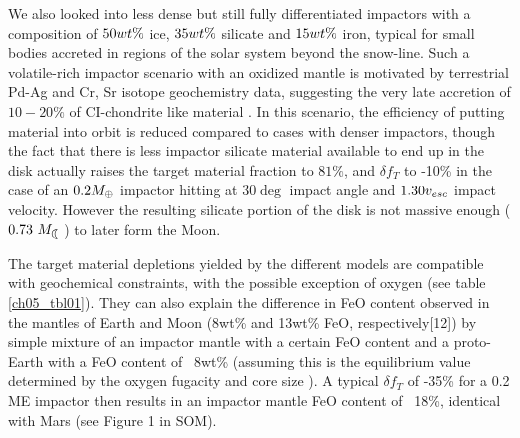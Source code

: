 We also looked into less dense but still fully differentiated impactors with a composition of $50 wt\mathrm{\%}$ ice, $35 wt\mathrm{\%}$ silicate and $15 wt\mathrm{\%}$ iron, typical for small bodies accreted in regions of the solar system beyond the snow-line. Such a volatile-rich impactor scenario with an oxidized mantle is motivated  by terrestrial Pd-Ag and Cr, Sr isotope geochemistry data, suggesting the very late accretion of $10-20\%$ of CI-chondrite like material \citep{2010Sci...328..884S}. In this scenario, the efficiency of putting material into orbit is reduced compared to cases with denser impactors, though the fact that there is less impactor silicate material available to end up in the disk actually raises the target material fraction to $81\%$, and $\delta f_{T}$ to -10\% in the case of an $0.2 M_{\oplus}$ impactor hitting at $30 \deg$ impact angle and $1.30 v_{esc}$ impact velocity. However the resulting silicate portion of the disk is not massive enough ($0.73 \ML$) to later form the Moon.  

The target material depletions yielded by the different models are compatible with geochemical constraints, with the possible exception of oxygen (see table \ref{ch05_tbl01}). They can also explain the difference in FeO content observed in the mantles of Earth and Moon (8wt\% and 13wt\% FeO, respectively[12]) by simple mixture of an impactor mantle with a certain FeO content and a proto-Earth with a FeO content of ~8wt\% (assuming this is the equilibrium value determined by the oxygen fugacity and core size \citep{2006mess.book..803R}). A typical $\delta f_{T}$ of -35\% for a 0.2 ME impactor then results in an impactor mantle FeO content of ~18\%, identical with Mars (see Figure 1 in SOM).

